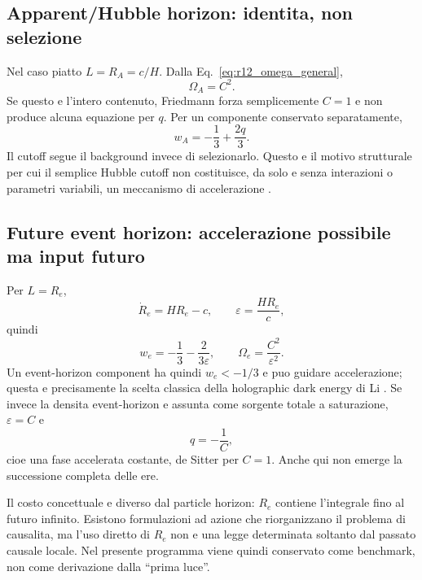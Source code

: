 \documentclass[11pt,a4paper]{article}
\begin{document}
\subsection{Apparent/Hubble horizon: identita, non selezione}

Nel caso piatto $L=R_A=c/H$. Dalla Eq.~\eqref{eq:r12_omega_general},
\begin{equation}
 \boxed{\Omega_A=C^2}.
\end{equation}
Se questo e l'intero contenuto, Friedmann forza semplicemente $C=1$ e non produce alcuna equazione per $q$. Per un componente conservato separatamente,
\begin{equation}
 \boxed{w_A=-\frac13+\frac{2q}{3}}.
\end{equation}
Il cutoff segue il background invece di selezionarlo. Questo e il motivo strutturale per cui il semplice Hubble cutoff non costituisce, da solo e senza interazioni o parametri variabili, un meccanismo di accelerazione \cite{Li2004}.

\subsection{Future event horizon: accelerazione possibile ma input futuro}

Per $L=R_e$,
\begin{equation}
 \dot R_e=HR_e-c,\qquad \varepsilon=\frac{HR_e}{c},
\end{equation}
quindi
\begin{equation}
 \boxed{w_e=-\frac13-\frac{2}{3\varepsilon}},
 \qquad
 \boxed{\Omega_e=\frac{C^2}{\varepsilon^2}}.
 \label{eq:r12_event_eos}
\end{equation}
Un event-horizon component ha quindi $w_e<-1/3$ e puo guidare accelerazione; questa e precisamente la scelta classica della holographic dark energy di Li \cite{Li2004}. Se invece la densita event-horizon e assunta come sorgente totale a saturazione, $\varepsilon=C$ e
\begin{equation}
 \boxed{q=-\frac1C},
\end{equation}
cioe una fase accelerata costante, de Sitter per $C=1$. Anche qui non emerge la successione completa delle ere.

Il costo concettuale e diverso dal particle horizon: $R_e$ contiene l'integrale fino al futuro infinito. Esistono formulazioni ad azione che riorganizzano il problema di causalita, ma l'uso diretto di $R_e$ non e una legge determinata soltanto dal passato causale locale. Nel presente programma viene quindi conservato come benchmark, non come derivazione dalla ``prima luce''.
\end{document}
